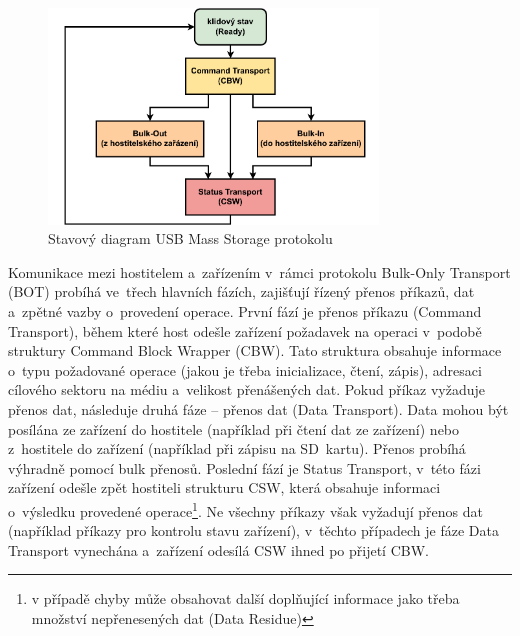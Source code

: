 \begin{figure}[h]
    \centering
    \includegraphics[width=0.78\textwidth]{obrazky-figures/mass_storage_protocol-3.pdf}
    
    \caption{Stavový diagram USB Mass Storage protokolu~\cite{silicon_labs_mass_storage_protocol}}
    \label{fig:mass-storage-protocol}
\end{figure}

Komunikace mezi hostitelem a~zařízením v~rámci protokolu Bulk-Only Transport (BOT) probíhá ve~třech hlavních fázích, zajišťují řízený přenos příkazů, dat a~zpětné vazby o~provedení operace. První fází je přenos příkazu (Command Transport), během které host odešle zařízení požadavek na operaci v~podobě struktury Command Block Wrapper (CBW). Tato struktura obsahuje informace o~typu požadované operace (jakou je třeba inicializace, čtení, zápis), adresaci cílového sektoru na médiu a~velikost přenášených dat. Pokud příkaz vyžaduje přenos dat, následuje druhá fáze -- přenos dat (Data Transport). Data mohou být posílána ze zařízení do hostitele (například při čtení dat ze zařízení) nebo z~hostitele do zařízení (například při zápisu na SD~kartu). Přenos probíhá výhradně pomocí bulk přenosů. Poslední fází je Status Transport, v~této fázi zařízení odešle zpět hostiteli strukturu CSW, která obsahuje informaci o~výsledku provedené operace\footnote{v případě chyby může obsahovat další doplňující informace jako třeba množství nepřenesených dat (Data Residue)}. Ne všechny příkazy však vyžadují přenos dat (například příkazy pro kontrolu stavu zařízení), v~těchto případech je fáze Data Transport vynechána a~zařízení odesílá CSW ihned po přijetí CBW.~\cite{silicon_labs_mass_storage_protocol}



